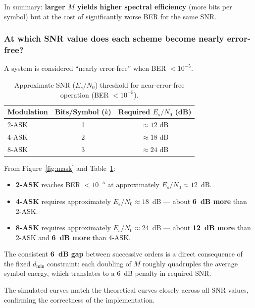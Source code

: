 In summary: \textbf{larger $M$ yields higher spectral efficiency} (more bits per symbol) but at the cost of significantly worse BER for the same SNR.

\subsubsection{At which SNR value does each scheme become nearly error-free?}

A system is considered ``nearly error-free'' when BER $< 10^{-5}$.

\begin{table}[H]
    \centering
    \caption{Approximate SNR ($E_s/N_0$) threshold for near-error-free operation (BER $< 10^{-5}$).}
    \label{tab:mask_snr}
    \begin{tabular}{lcc}
        \hline
        \textbf{Modulation} & \textbf{Bits/Symbol ($k$)} & \textbf{Required $E_s/N_0$ (dB)} \\
        \hline
        2-ASK & 1 & $\approx 12$ dB \\
        4-ASK & 2 & $\approx 18$ dB \\
        8-ASK & 3 & $\approx 24$ dB \\
        \hline
    \end{tabular}
\end{table}

From Figure~\ref{fig:mask} and Table~\ref{tab:mask_snr}:
\begin{itemize}
    \item \textbf{2-ASK} reaches BER $< 10^{-5}$ at approximately $E_s/N_0 \approx 12$~dB.
    \item \textbf{4-ASK} requires approximately $E_s/N_0 \approx 18$~dB — about \textbf{6~dB more} than 2-ASK.
    \item \textbf{8-ASK} requires approximately $E_s/N_0 \approx 24$~dB — about \textbf{12~dB more} than 2-ASK and \textbf{6~dB more} than 4-ASK.
\end{itemize}

The consistent \textbf{6~dB gap} between successive orders is a direct consequence of the fixed $d_{\min}$ constraint: each doubling of $M$ roughly quadruples the average symbol energy, which translates to a 6~dB penalty in required SNR.

The simulated curves match the theoretical curves closely across all SNR values, confirming the correctness of the implementation.
